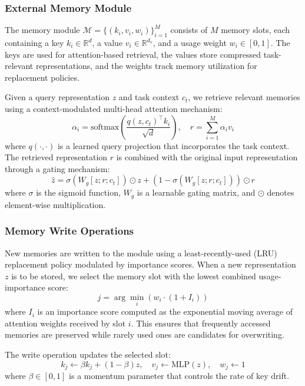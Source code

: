 \documentclass[11pt]{article}
\begin{document}
\subsubsection{External Memory Module}

The memory module $\mathcal{M} = \{(k_i, v_i, w_i)\}_{i=1}^{M}$ consists of $M$ memory slots, each containing a key $k_i \in \mathbb{R}^d$, a value $v_i \in \mathbb{R}^{d_v}$, and a usage weight $w_i \in [0, 1]$. The keys are used for attention-based retrieval, the values store compressed task-relevant representations, and the weights track memory utilization for replacement policies.

Given a query representation $z$ and task context $c_t$, we retrieve relevant memories using a context-modulated multi-head attention mechanism:
\begin{equation}
    \alpha_i = \text{softmax}\left(\frac{q(z, c_t)^\top k_i}{\sqrt{d}}\right), \quad r = \sum_{i=1}^{M} \alpha_i v_i
\end{equation}
where $q(\cdot, \cdot)$ is a learned query projection that incorporates the task context. The retrieved representation $r$ is combined with the original input representation through a gating mechanism:
\begin{equation}
    \hat{z} = \sigma(W_g [z; r; c_t]) \odot z + (1 - \sigma(W_g [z; r; c_t])) \odot r
\end{equation}
where $\sigma$ is the sigmoid function, $W_g$ is a learnable gating matrix, and $\odot$ denotes element-wise multiplication.

\subsubsection{Memory Write Operations}

New memories are written to the module using a least-recently-used (LRU) replacement policy modulated by importance scores. When a new representation $z$ is to be stored, we select the memory slot with the lowest combined usage-importance score:
\begin{equation}
    j = \arg\min_i \left( w_i \cdot (1 + I_i) \right)
\end{equation}
where $I_i$ is an importance score computed as the exponential moving average of attention weights received by slot $i$. This ensures that frequently accessed memories are preserved while rarely used ones are candidates for overwriting.

The write operation updates the selected slot:
\begin{equation}
    k_j \leftarrow \beta k_j + (1 - \beta) z, \quad v_j \leftarrow \text{MLP}(z), \quad w_j \leftarrow 1
\end{equation}
where $\beta \in [0, 1]$ is a momentum parameter that controls the rate of key drift.
\end{document}

